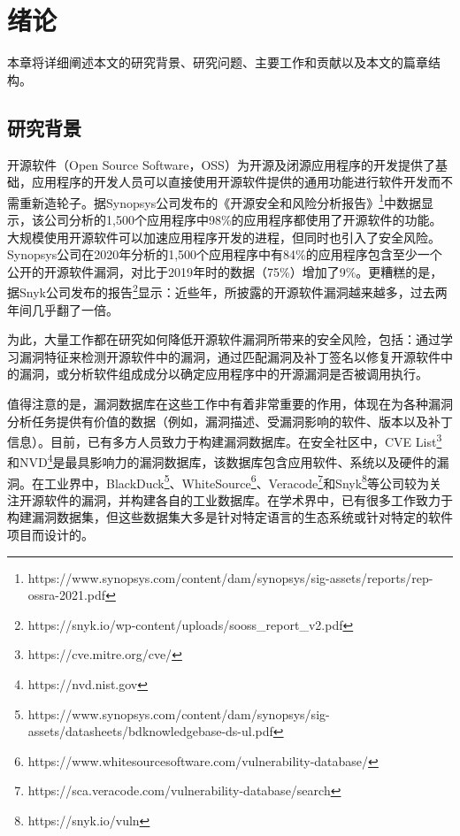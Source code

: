 \chapter{绪论}

本章将详细阐述本文的研究背景、研究问题、主要工作和贡献以及本文的篇章结构。

\section{研究背景}

开源软件（Open Source Software，OSS）为开源及闭源应用程序的开发提供了基础，应用程序的开发人员可以直接使用开源软件提供的通用功能进行软件开发而不需重新造轮子。据Synopsys公司发布的《开源安全和风险分析报告》\footnote{https://www.synopsys.com/content/dam/synopsys/sig-assets/reports/rep-ossra-2021.pdf}中数据显示，该公司分析的1,500个应用程序中98\%的应用程序都使用了开源软件的功能。大规模使用开源软件可以加速应用程序开发的进程，但同时也引入了安全风险。Synopsys公司在2020年分析的1,500个应用程序中有84\%的应用程序包含至少一个公开的开源软件漏洞，对比于2019年时的数据（75\%）增加了9\%。更糟糕的是，据Snyk公司发布的报告\footnote{https://snyk.io/wp-content/uploads/sooss\_report\_v2.pdf}显示：近些年，所披露的开源软件漏洞越来越多，过去两年间几乎翻了一倍。

为此，大量工作都在研究如何降低开源软件漏洞所带来的安全风险，包括：通过学习漏洞特征来检测开源软件中的漏洞\cite{li2016vulpecker,li2018vuldeepecker,zhou2019devign,jimenez2019importance}，通过匹配漏洞及补丁签名\cite{jang2012redebug, kim2017vuddy, xu2020patch, xiao2020mvp, cui2020vuldetector}以修复开源软件中的漏洞\cite{mulliner2013patchdroid, duan2019automating, xu2020automatic, machiry2020spider}，或分析软件组成成分以确定应用程序中的开源漏洞是否被调用执行\cite{pashchenko2018vulnerable, ponta2020detection, pashchenko2020vuln4real, Wang2020empirical}。

值得注意的是，漏洞数据库在这些工作中有着非常重要的作用，体现在为各种漏洞分析任务提供有价值的数据（例如，漏洞描述、受漏洞影响的软件、版本以及补丁信息）。目前，已有多方人员致力于构建漏洞数据库。在安全社区中，CVE List\footnote{https://cve.mitre.org/cve/}和NVD\footnote{https://nvd.nist.gov}是最具影响力的漏洞数据库，该数据库包含应用软件、系统以及硬件的漏洞。在工业界中，BlackDuck\footnote{https://www.synopsys.com/content/dam/synopsys/sig-assets/datasheets/bdknowledgebase-ds-ul.pdf}、WhiteSource\footnote{https://www.whitesourcesoftware.com/vulnerability-database/}、Veracode\footnote{https://sca.veracode.com/vulnerability-database/search}和Snyk\footnote{https://snyk.io/vuln}等公司较为关注开源软件的漏洞，并构建各自的工业数据库。在学术界中，已有很多工作致力于构建漏洞数据集\cite{ponta2019manually,fan2020ac,jimenez2018enabling,gkortzis2018vulinoss,namrud2019androvul}，但这些数据集大多是针对特定语言的生态系统或针对特定的软件项目而设计的。

